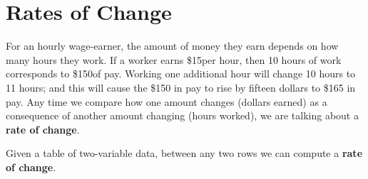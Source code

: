 \documentclass[nooutcomes]{ximera}
\begin{document}

\section{Rates of Change}

For an hourly wage-earner, the amount of money they earn depends on how many hours they work. If a worker earns \$15per hour, then 10
hours of work corresponds to \$150of pay. Working one additional hour will change 10 hours to 11 hours; and this will cause the \$150 in pay to rise by fifteen dollars to \$165 in pay. Any time we compare how one amount changes (dollars earned) as a consequence of another amount changing (hours worked), we are talking about a \textbf{rate of change}.

Given a table of two-variable data, between any two rows we can compute a \textbf{rate of change}.
\end{document}
